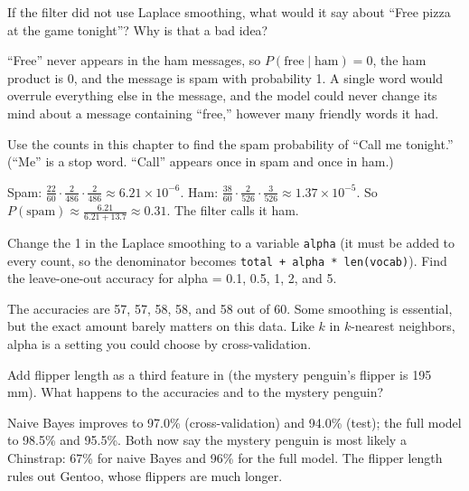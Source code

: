 \begin{Exercise}[label=bayes_classifier2, title={Without smoothing}]
If the filter did not use Laplace smoothing, what would it say about ``Free pizza at the game tonight''? Why is
that a bad idea?
\end{Exercise}
\begin{Answer}[ref=bayes_classifier2]
``Free'' never appears in the ham messages, so $P(\text{free} \mid \text{ham}) = 0$, the ham product is 0, and the
message is spam with probability 1. A single word would overrule everything else in the message, and the model
could never change its mind about a message containing ``free,'' however many friendly words it had.
\end{Answer}

\begin{Exercise}[label=bayes_classifier3, title={Call me tonight}, space=3cm]
Use the counts in this chapter to find the spam probability of ``Call me tonight.'' (``Me'' is a stop word.
``Call'' appears once in spam and once in ham.)
\end{Exercise}
\begin{Answer}[ref=bayes_classifier3]
Spam: $\frac{22}{60} \cdot \frac{2}{486} \cdot \frac{2}{486} \approx 6.21 \times 10^{-6}$. Ham:
$\frac{38}{60} \cdot \frac{2}{526} \cdot \frac{3}{526} \approx 1.37 \times 10^{-5}$. So
$P(\text{spam}) \approx \frac{6.21}{6.21 + 13.7} \approx 0.31$. The filter calls it ham.
\end{Answer}

\begin{Exercise}[label=bayes_classifier4, title={How much smoothing?}]
Change the 1 in the Laplace smoothing to a variable \verb|alpha| (it must be added to every count, so the
denominator becomes \verb|total + alpha * len(vocab)|). Find the leave-one-out accuracy for alpha = 0.1, 0.5, 1,
2, and 5.
\end{Exercise}
\begin{Answer}[ref=bayes_classifier4]
The accuracies are 57, 57, 58, 58, and 58 out of 60. Some smoothing is essential, but the exact amount barely
matters on this data. Like $k$ in $k$-nearest neighbors, alpha is a setting you could choose by cross-validation.
\end{Answer}

\begin{Exercise}[label=bayes_classifier5, title={A third feature}]
Add flipper length as a third feature in  (the mystery penguin's flipper is 195 mm).
What happens to the accuracies and to the mystery penguin?
\end{Exercise}
\begin{Answer}[ref=bayes_classifier5]
Naive Bayes improves to 97.0\% (cross-validation) and 94.0\% (test); the full model to 98.5\% and 95.5\%. Both
now say the mystery penguin is most likely a Chinstrap: 67\% for naive Bayes and 96\% for the full model. The
flipper length rules out Gentoo, whose flippers are much longer.
\end{Answer}
